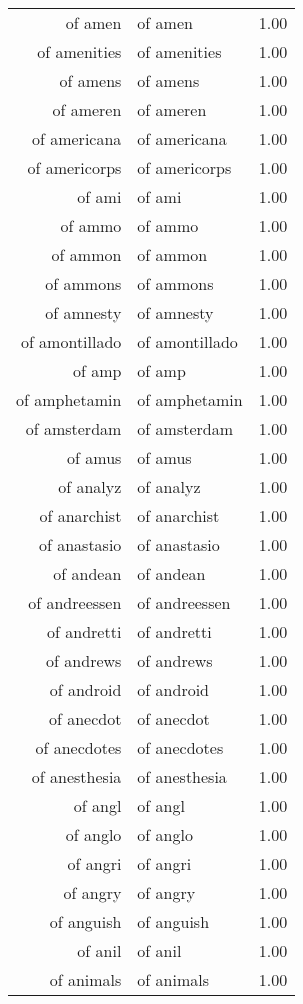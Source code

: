 \begin{table}[ht]
\begin{tabular}{rlr}
  of amen & of amen & 1.00 \\ 
  of amenities & of amenities & 1.00 \\ 
  of amens & of amens & 1.00 \\ 
  of ameren & of ameren & 1.00 \\ 
  of americana & of americana & 1.00 \\ 
  of americorps & of americorps & 1.00 \\ 
  of ami & of ami & 1.00 \\ 
  of ammo & of ammo & 1.00 \\ 
  of ammon & of ammon & 1.00 \\ 
  of ammons & of ammons & 1.00 \\ 
  of amnesty & of amnesty & 1.00 \\ 
  of amontillado & of amontillado & 1.00 \\ 
  of amp & of amp & 1.00 \\ 
  of amphetamin & of amphetamin & 1.00 \\ 
  of amsterdam & of amsterdam & 1.00 \\ 
  of amus & of amus & 1.00 \\ 
  of analyz & of analyz & 1.00 \\ 
  of anarchist & of anarchist & 1.00 \\ 
  of anastasio & of anastasio & 1.00 \\ 
  of andean & of andean & 1.00 \\ 
  of andreessen & of andreessen & 1.00 \\ 
  of andretti & of andretti & 1.00 \\ 
  of andrews & of andrews & 1.00 \\ 
  of android & of android & 1.00 \\ 
  of anecdot & of anecdot & 1.00 \\ 
  of anecdotes & of anecdotes & 1.00 \\ 
  of anesthesia & of anesthesia & 1.00 \\ 
  of angl & of angl & 1.00 \\ 
  of anglo & of anglo & 1.00 \\ 
  of angri & of angri & 1.00 \\ 
  of angry & of angry & 1.00 \\ 
  of anguish & of anguish & 1.00 \\ 
  of anil & of anil & 1.00 \\ 
  of animals & of animals & 1.00 \\ 

\end{tabular}
\end{table}
